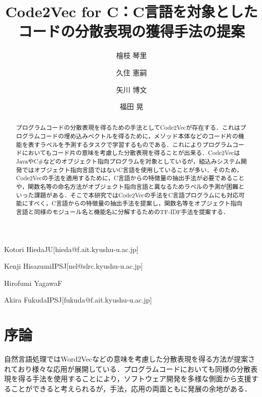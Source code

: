 \documentclass[submit,techrep,noauthor]{ipsj}
\begin{document}
\title{Code2Vec for C：C言語を対象としたコードの分散表現の獲得手法の提案}



\author{檜枝 琴里}{Kotori Hieda}{JU}[hieda@f.ait.kyushu-u.ac.jp]
\author{久住 憲嗣}{Kenji Hisazumi}{IPSJ}[nel@slrc.kyushu-u.ac.jp]
\author{矢川 博文}{Hirofumi Yagawa}{F}
\author{福田 晃}{Akira Fukuda}{IPSJ}[fukuda@f.ait.kyushu-u.ac.jp]

\begin{abstract}
プログラムコードの分散表現を得るための手法としてCode2Vecが存在する．これはプログラムコードの埋め込みベクトルを得るために，メソッド本体などのコード片の機能を表すラベルを予測するタスクで学習するものである．これによりプログラムコードにおいてもコード片の意味を考慮した分散表現を得ることが出来る．Code2VecはJavaやC\#などのオブジェクト指向プログラムを対象としているが，組込みシステム開発ではオブジェクト指向言語ではないC言語を使用していることが多い．そのため，Code2Vecの手法を適用するために，C言語からの特徴量の抽出手法が必要であることや，関数名等の命名方法がオブジェクト指向言語と異なるためラベルの予測が困難といった課題がある．そこで本研究ではCode2Vecの手法をC言語プログラムにも対応可能にすべく，C言語からの特徴量の抽出手法を提案し，関数名等をオブジェクト指向言語と同様のモジュール名と機能名に分解するためのTF-IDF手法を提案する．
\end{abstract}



\maketitle

\section{序論}
自然言語処理ではWord2Vec\cite{rong2014word2vec}などの意味を考慮した分散表現を得る方法が提案されており様々な応用が展開している．プログラムコードにおいても同様の分散表現を得る手法を使用することにより，ソフトウェア開発を多様な側面から支援することができると考えられるが，手法，応用の両面ともに発展の余地がある．
\end{document}
